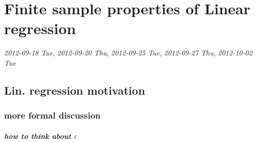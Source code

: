 
\chapter{Finite sample properties of Linear regression}

   \textit{2012-09-18 Tue}, \textit{2012-09-20 Thu}, \textit{2012-09-25 Tue}, 
   \textit{2012-09-27 Thu}, \textit{2012-10-02 Tue}
\section{Lin. regression motivation}
\label{sec-1}
\subsection{more formal discussion}
\label{sec-1-1}
\paragraph{how to think about $\varepsilon$}
\label{sec-1-1-1}

